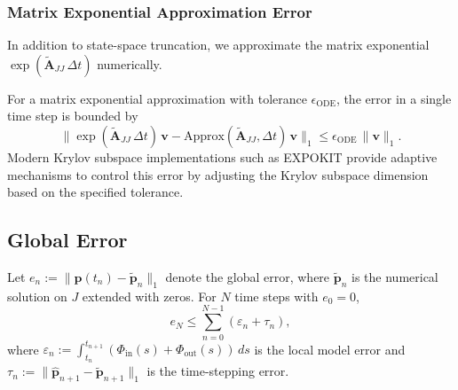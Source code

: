\documentclass[review,onefignum,onetabnum]{siamart171218}
\begin{document}
\subsubsection{Matrix Exponential Approximation Error}
\label{subsec:time_stepping_error_analysis}

In addition to state-space truncation, we approximate the matrix exponential $\exp(\widetilde{\mathbf{A}}_{JJ}\,\Delta t)$ numerically. 

\begin{proposition}
\label{prop:local_time_error}
For a matrix exponential approximation with tolerance $\epsilon_{\mathrm{ODE}}$, the error in a single time step is bounded by
\begin{equation}
\|\exp(\widetilde{\mathbf{A}}_{JJ}\,\Delta t)\,\boldsymbol{v} - \mathrm{Approx}(\widetilde{\mathbf{A}}_{JJ}, \Delta t)\,\boldsymbol{v}\|_1 \le \epsilon_{\mathrm{ODE}}\,\|\boldsymbol{v}\|_1.
\end{equation}
Modern Krylov subspace implementations such as EXPOKIT \cite{Sidje1998} provide adaptive mechanisms to control this error by adjusting the Krylov subspace dimension based on the specified tolerance.
\end{proposition}

\subsection{Global Error}

\begin{corollary}
\label{cor:global-error}
Let $e_n := \|\boldsymbol{p}(t_n) - \widetilde{\boldsymbol{p}}_n\|_1$ denote the global error, where $\widetilde{\boldsymbol{p}}_n$ is the numerical solution on $J$ extended with zeros. For $N$ time steps with $e_0 = 0$,
\begin{equation}
e_N \leq \sum_{n=0}^{N-1} (\varepsilon_n + \tau_n),
\end{equation}
where $\varepsilon_n := \int_{t_n}^{t_{n+1}} (\Phi_{\mathrm{in}}(s) + \Phi_{\mathrm{out}}(s)) \, ds$ is the local model error and $\tau_n := \|\widehat{\boldsymbol{p}}_{n+1} - \widetilde{\boldsymbol{p}}_{n+1}\|_1$ is the time-stepping error.
\end{corollary}
\end{document}
